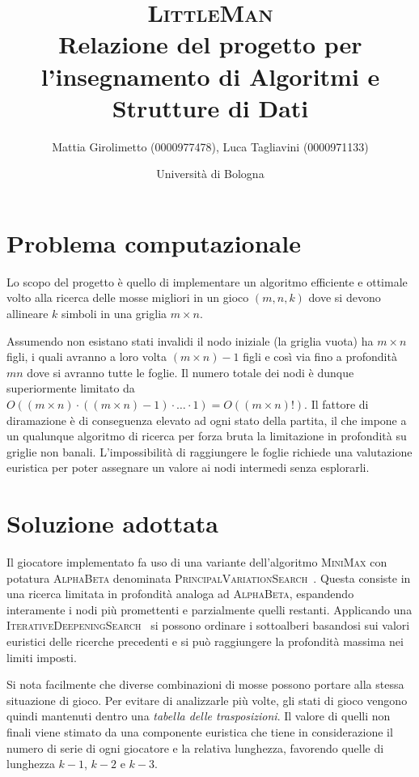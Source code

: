 \documentclass{article}
\title{\textsc{LittleMan}\\
\large Relazione del progetto per l'insegnamento di Algoritmi e Strutture di Dati}
\author{
  Mattia Girolimetto (0000977478),
  Luca Tagliavini (0000971133)
}
\date{
	Universit\`a di Bologna \\
  \displaydate{date}
}
\begin{document}
\maketitle
\pagebreak
\tableofcontents
\pagebreak

\section{Problema computazionale}

Lo scopo del progetto \`e quello di implementare un algoritmo efficiente e ottimale
volto alla ricerca delle mosse migliori in un gioco $(m,n,k)$ dove si devono
allineare $k$ simboli in una griglia $m \times n$.

Assumendo non esistano stati invalidi il nodo iniziale (la griglia vuota)
ha $m \times n$ figli, i quali avranno a loro volta $(m \times n)-1$ figli e cos\`i
via fino a profondit\`a $mn$ dove si avranno tutte le foglie. Il numero totale
dei nodi \`e dunque superiormente limitato da $O((m \times n) \cdot ((m \times n)-1)
\cdot \ldots \cdot 1) = O((m \times n)!)$.
Il fattore di diramazione \`e di conseguenza elevato ad ogni stato della partita, il che
impone a un qualunque algoritmo di ricerca per forza bruta la limitazione in
profondit\`a su griglie non banali. L'impossibilit\`a di raggiungere le foglie
richiede una valutazione euristica per poter assegnare un valore ai nodi intermedi
senza esplorarli.

\section{Soluzione adottata}

Il giocatore implementato fa uso di una variante dell'algoritmo \textsc{MiniMax} con potatura
\textsc{AlphaBeta} denominata \textsc{PrincipalVariationSearch}~\cite{negascout}. Questa
consiste in una ricerca limitata in profondit\`a analoga ad \textsc{AlphaBeta}, espandendo 
interamente i nodi pi\`u promettenti e parzialmente quelli restanti. Applicando
una \textsc{IterativeDeepeningSearch}~\cite{id} si possono ordinare i sottoalberi
basandosi sui valori euristici delle ricerche precedenti e si pu\`o raggiungere
la profondit\`a massima nei limiti imposti.

Si nota facilmente che diverse combinazioni di mosse possono portare alla stessa 
situazione di gioco.
Per evitare di analizzarle pi\`u volte, gli stati di gioco vengono quindi mantenuti 
dentro una \emph{tabella delle trasposizioni}. Il valore di quelli non finali
viene stimato da una componente euristica che tiene in considerazione il numero
di serie di ogni giocatore e la relativa lunghezza, favorendo quelle di lunghezza
$k-1$, $k-2$ e $k-3$.
\end{document}
